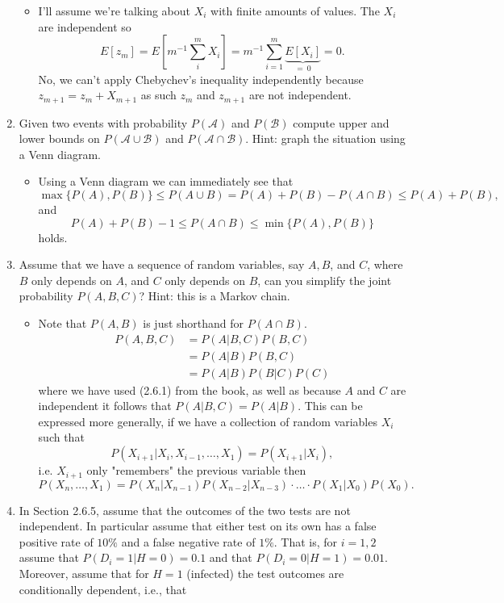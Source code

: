 \documentclass{article}
\begin{document}
\begin{enumerate}
\begin{itemize}
			\item I'll assume we're talking about $X_i$ with finite amounts of values. The $X_i$ are independent so
			$$
			E[z_m] = E[m^{-1}\sum_i^m X_i] = m^{-1} \sum_{i = 1}^m \underbrace{E[X_i]}_{=\ 0} = 0.
			$$
			No, we can't apply Chebychev's inequality independently because $z_{m + 1} = z_m + X_{m + 1}$ as such $z_m$ and $z_{m + 1}$ are not independent.
		\end{itemize}
	\item Given two events with probability $P(\mathcal{A})$ and $P(\mathcal{B})$ compute upper and lower bounds on $P(\mathcal{A} \cup \mathcal{B})$ and $P(\mathcal{A} \cap \mathcal{B})$. Hint: graph the situation using a Venn diagram.
		\begin{itemize}
			\item Using a Venn diagram we can immediately see that
			$$
			\max\{P(A), P(B) \} \leq P(A \cup B) = P(A) + P(B) - P(A \cap B) \leq P(A) + P(B),
			$$
			and
			$$
			P(A) + P(B) - 1 \leq P(A \cap B) \leq \min\{P(A), P(B)\}
			$$
			holds.
		\end{itemize}
	\item Assume that we have a sequence of random variables, say $A, B$, and $C$, where $B$ only depends on $A$, and $C$ only depends on $B$, can you simplify the joint probability $P(A, B, C)$? Hint: this is a Markov chain.
		\begin{itemize}
			\item Note that $P(A, B)$ is just shorthand for $P(A \cap B)$.
			\begin{align*}
			P(A, B, C) &= P(A|B, C) P(B, C) \\
			&= P(A|B) P(B, C) \\
			&= P(A|B) P(B|C) P(C)
			\end{align*}
			where we have used (2.6.1) from the book, as well as because $A$ and $C$ are independent it follows that $P(A|B, C) = P(A|B)$. This can be expressed more generally, if we have a collection of random variables $X_i$ such that
			$$
			P(X_{i + 1} | X_i, X_{i - 1}, \dots, X_1) = P(X_{i + 1}| X_i),
			$$
			i.e. $X_{i + 1}$ only "remembers" the previous variable then
			$$
			P(X_n, \dots, X_1) = P(X_n|X_{n - 1})P(X_{n - 2}|X_{n - 3})\cdot \dots \cdot P(X_1|X_0)P(X_0).
			$$
		\end{itemize}
	\item In Section 2.6.5, assume that the outcomes of the two tests are not independent. In particular assume that either test on its own has a false positive rate of $10\%$ and a false negative rate of $1\%$. That is, for $i = 1, 2$ assume that $P(D_i = 1 | H = 0) = 0.1$ and that $P(D_i = 0 | H = 1) = 0.01$. Moreover, assume that for $H = 1$ (infected) the test outcomes are conditionally dependent, i.e., that 

\end{enumerate}
\end{document}
